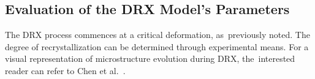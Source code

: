 \documentclass[metals,article,accept,pdftex,moreauthors]{Definitions/mdpi}
\makeatletter
\DeclareRobustCommand{\eal}{et al.\@\xspace}
\makeatother
\begin{document}
\subsection{Evaluation of the DRX Model's Parameters}\label{subsec:DRXparams}

The DRX process commences at a critical deformation, as~previously noted.
\linebreak The degree of recrystallization can be determined through experimental means.
For a visual representation of microstructure evolution during DRX, the~interested reader can refer to Chen \eal~\cite{Chen-2019}.
\end{document}
